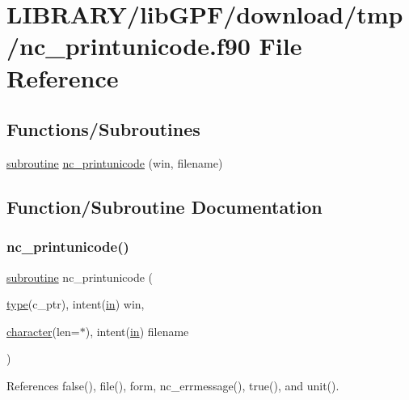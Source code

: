 \hypertarget{nc__printunicode_8f90}{}\section{L\+I\+B\+R\+A\+R\+Y/lib\+G\+P\+F/download/tmp/nc\+\_\+printunicode.f90 File Reference}
\label{nc__printunicode_8f90}
\subsection*{Functions/\+Subroutines}
\begin{DoxyCompactItemize}
\item 
\hyperlink{M__stopwatch_83_8txt_acfbcff50169d691ff02d4a123ed70482}{subroutine} \hyperlink{nc__printunicode_8f90_ab56a30537897cb7b2a3e7e4c44767b05}{nc\+\_\+printunicode} (win, filename)
\end{DoxyCompactItemize}


\subsection{Function/\+Subroutine Documentation}
\mbox{\label{nc__printunicode_8f90_ab56a30537897cb7b2a3e7e4c44767b05}} 
\subsubsection{\texorpdfstring{nc\+\_\+printunicode()}{nc\_printunicode()}}
{\footnotesize\ttfamily \hyperlink{M__stopwatch_83_8txt_acfbcff50169d691ff02d4a123ed70482}{subroutine} nc\+\_\+printunicode (\begin{DoxyParamCaption}\item[{\hyperlink{stop__watch_83_8txt_a70f0ead91c32e25323c03265aa302c1c}{type}(c\+\_\+ptr), intent(\hyperlink{M__journal_83_8txt_afce72651d1eed785a2132bee863b2f38}{in})}]{win,  }\item[{\hyperlink{option__stopwatch_83_8txt_abd4b21fbbd175834027b5224bfe97e66}{character}(len=$\ast$), intent(\hyperlink{M__journal_83_8txt_afce72651d1eed785a2132bee863b2f38}{in})}]{filename }\end{DoxyParamCaption})}



References false(), file(), form, nc\+\_\+errmessage(), true(), and unit().

